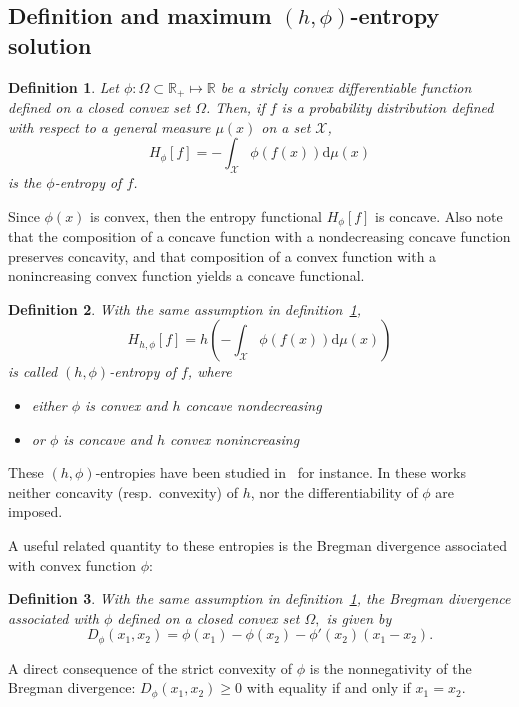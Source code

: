 \documentclass[english,onecolumn]{elsarticle}
\def\dmu{\mathrm{d}\mu}
\def\Rset{\mathbb{R}}
\def\X{\mathcal{X}}
\newtheorem{definition}{Definition}
\begin{document}

\subsection{Definition and maximum $(h,\phi)$-entropy solution}


\begin{definition}
  Let  $\phi:  \Omega  \subset  \Rset_+  \mapsto  \Rset$  be  a  stricly  convex
  differentiable function defined on a closed convex set $\Omega$.  Then, if $f$
  is  a probability  distribution  defined  with respect  to  a general  measure
  $\mu(x)$ on a set $\X$,
%
\begin{equation}
H_\phi[f] = - \int_{\X} \phi(f(x)) \dmu(x)
\label{eq:phi-entropy}
\end{equation}
%
is the $\phi$-entropy of $f$.
\label{def:phi_entropy}
\end{definition}
%
Since $\phi(x)$ is convex, then the entropy functional $H_{\phi}[f]$ is concave.
Also  note that  the composition  of a  concave function  with a  nondecreasing
concave function preserves concavity, and  that composition of a convex function
with a nonincreasing convex function yields a concave functional.

\begin{definition}%
%
With the same assumption in definition~\ref{def:phi_entropy},
%
\begin{equation}
H_{h,\phi}[f] = h\left( - \int_{\X} \phi(f(x)) \dmu(x) \right)
\label{eq:h-phi-entropy}
\end{equation}
%
is called $(h,\phi)$-entropy of $f$, where
%
\begin{itemize}
\item either $\phi$ is convex  and $h$ concave  nondecreasing
\item or $\phi$ is concave and $h$ convex nonincreasing
\end{itemize}
\end{definition}
%
These  $(h,\phi)$-entropies  have   been  studied  in~\cite{Sal93,MenMor97}  for
instance. In  these works neither concavity  (resp.\ convexity) of  $h$, nor the
differentiability of $\phi$ are imposed.

A  useful  related  quantity  to  these  entropies  is  the  Bregman  divergence
associated with convex function $\phi$:
%
\begin{definition}
  With  the  same assumption  in  definition~\ref{def:phi_entropy}, the  Bregman
  divergence associated with $\phi$ defined  on a closed convex set $\Omega,$ is
  given by
  \begin{equation}
    D_{\phi}(x_1,x_2)=\phi(x_{1})-\phi(x_{2})-\phi'(x_{2})\left(x_{1}-x_{2}\right).
  \end{equation}
  \label{def:Bregman}
\end{definition}
%
A direct consequence  of the strict convexity of $\phi$  is the nonnegativity of
the Bregman  divergence: $D_\phi(x_1,x_2)  \ge 0$ with  equality if and  only if
$x_1 = x_2$.
\end{document}
